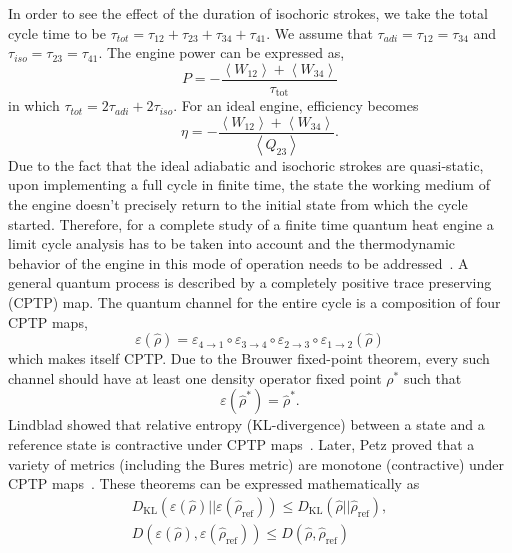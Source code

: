 \documentclass[aps,pra,twocolumn,showpacs,showkeys,groupedaddress,nobalancelastpage,nofootinbib,floatfix,superscriptaddress,longbibliography]{revtex4-2}
\begin{document}
In order to see the effect of the duration of isochoric strokes, we take the total cycle time to be $\tau_{tot} = \tau_{12} + \tau_{23} + \tau_{34} + \tau_{41}$. We assume that $\tau_{adi}=\tau_{12} = \tau_{34}$ and $\tau_{iso}=\tau_{23} = \tau_{41}$. The engine power can be expressed as,
\begin{equation}\label{engine.power}
  P = -\frac{\left\langle W_{12}\right\rangle + \left\langle W_{34}\right\rangle}{\tau_{\text{tot}}}
\end{equation}
in which $\tau_{tot}=2\tau_{adi}+2\tau_{iso}$. For an ideal engine, efficiency becomes
\begin{equation}\label{engine.efficiency}
  \eta = -\frac{\left\langle W_{12}\right\rangle + \left\langle W_{34}\right\rangle}{\left\langle Q_{23}\right\rangle}.
\end{equation}
Due to the fact that the ideal adiabatic and isochoric strokes are quasi-static, upon implementing a full cycle in finite time, the state
the working medium of the engine doesn't precisely return to the initial state from which the cycle started. Therefore, for a complete study of a finite time quantum heat engine a limit cycle analysis has to be taken into account and the thermodynamic behavior of the engine in this mode of operation needs to be
addressed~\cite{Kosloff2017TheQH,PhysRevE.97.062153,PhysRevE.70.046110}. A general quantum process is described by a completely positive trace
preserving (CPTP) map. The quantum channel for the entire cycle is a composition of four CPTP maps,
\begin{equation}\label{cyclemap}
  \varepsilon(\hat{\rho})= \varepsilon_{4\rightarrow1}\circ\varepsilon_{3\rightarrow4}\circ\varepsilon_{2\rightarrow3}\circ\varepsilon_{1\rightarrow2}(\hat{\rho})
\end{equation}
which makes itself CPTP. Due to the Brouwer fixed-point theorem, every such channel should have at least one density operator fixed point $\rho^*$ such that~\cite{watrous_2018}
\begin{equation}\label{limitcyc}
  \varepsilon(\hat{\rho}^*) = \hat{\rho}^*.
\end{equation}
Lindblad showed that relative entropy (KL-divergence) between a state and a reference state is contractive under CPTP
maps~\cite{Lindblad1975}. Later, Petz proved that a variety of metrics (including the Bures metric) are monotone (contractive) under CPTP maps~\cite{PETZ199681}. These theorems can be expressed mathematically as 
\begin{eqnarray}\label{monotone}
  D_{\text{KL}}(\varepsilon(\hat{\rho})||\varepsilon(\hat{\rho}_{\text{ref}})) \leq D_{\text{KL}}(\hat{\rho}||\hat{\rho}_{\text{ref}}),\\
  D(\varepsilon(\hat{\rho}),\varepsilon(\hat{\rho}_{\text{ref}})) \leq D(\hat{\rho},\hat{\rho}_{\text{ref}})
\end{eqnarray}
\end{document}
